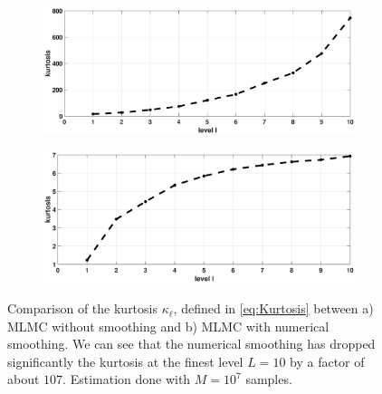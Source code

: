 \begin{figure}[htb]
	\centering %
	\begin{subfigure}{0.5\textwidth}
		\includegraphics[width=\linewidth]{./figures/MLMC_binary_Heston_opt/without_smoothing/kurtosis_L_0_1_step}
		\caption{}
		\label{fig:kurt_hest_digital_non_smoothing_FT}
	\end{subfigure}\hfil %
	\begin{subfigure}{0.5\textwidth}
		\includegraphics[width=\linewidth]{./figures/MLMC_binary_Heston_opt/with_smoothing/kurtosis}
		\caption{}
		\label{fig:kurt_hest_digital_smoothing}
	\end{subfigure}\hfil %
	\caption{Comparison of the kurtosis $\kappa_{\ell}$, defined in \eqref{eq:Kurtosis} between a) MLMC without smoothing and b) MLMC with numerical smoothing. We can see that the numerical smoothing has dropped significantly the kurtosis at the finest level $L=10$  by a factor  of about $107$.  Estimation done with $M=10^7$ samples.}
	\label{fig:kurt_hest_digital}	
\end{figure}
\FloatBarrier

